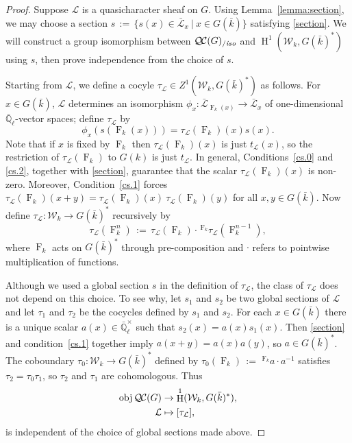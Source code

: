 \documentclass[11pt]{amsart}
\theoremstyle{plain}
\theoremstyle{definition}
\theoremstyle{remark}
\newcommand{\EE}{\mathbb{\bar Q}_\ell}
\newcommand{\bFq}{\bar{k}}
\newcommand{\Fq}{k}
\newcommand{\EEx}{\EE^\times}
\newcommand{\Frob}[1]{\operatorname{F}_{#1}}
\DeclareMathOperator{\Hh}{H}
\newcommand{\ceq}{{\, :=\, }}
\newcommand{\tq}{{\ \vert\ }}
\newcommand{\obj}{{\text{obj}\, }}
\newcommand{\qcs}[1]{{\mathcal{#1}}}
\newcommand{\gqcs}[1]{{\mathcal{\bar #1}}}
\newcommand{\QC}{{\mathcal{Q\hskip-0.8pt C}}}
\newcommand{\QCiso}[1]{\QC(#1)_{/\textit{iso}}}
\newcommand{\Weil}[1]{\mathcal{W}_{#1}}
\newcommand{\trFrob}[1]{t_{#1}}
\begin{document}
\begin{proof}
  Suppose $\qcs{L}$ is a quasicharacter sheaf on $G$.  
  Using Lemma~\ref{lemma:section}, 
  we may choose a section $s \ceq \{ s(x) \in \gqcs{L}_x \tq x \in G(\bFq) \}$ satisfying \eqref{section}.
  We will construct a group isomorphism between $\QCiso{G}$ and
  $\Hh^1(\Weil{\Fq}, G(\bFq)^*)$ using $s$, then prove independence from the choice of $s$.

  Starting from $\qcs{L}$, we define a cocyle $\tau_{\qcs{L}} \in Z^1(\Weil{\Fq},G(\bFq)^*)$ as follows.
  For $x \in G(\bFq)$, $\qcs{L}$ determines an isomorphism $\phi_x : \gqcs{L}_{\Frob{\Fq}(x)} \to \gqcs{L}_x$
  of one-dimensional $\EE$-vector spaces; define $\tau_\qcs{L}$ by
  \begin{equation}\label{t}
   \phi_{x}(s(\Frob{\Fq}(x))) = \tau_\qcs{L}(\Frob{\Fq})(x) s(x).
  \end{equation}
  Note that if $x$ is fixed by $\Frob{k}$ then $\tau_\qcs{L}(\Frob{\Fq})(x)$ is just $\trFrob{\qcs{L}}(x)$, so the restriction of
  $\tau_\qcs{L}(\Frob{k})$ to $G(k)$ is just $\trFrob{\qcs{L}}$.
  In general, Conditions~\ref{cs.0} and \ref{cs.2}, together with \eqref{section}, guarantee that
  the scalar $\tau_\qcs{L}(\Frob{k})(x)$ is non-zero.  Moreover, Condition~\ref{cs.1} forces
  $\tau_\qcs{L}(\Frob{\Fq})(x+y) = \tau_\qcs{L}(\Frob{\Fq})(x) \ \tau_\qcs{L}(\Frob{\Fq})(y)$
  for all $x,y \in G(\bFq)$.  Now define $\tau_\qcs{L} : \Weil{\Fq} \to G(\bFq)^*$ recursively by
  \[
   \tau_\qcs{L}(\Frob{\Fq}^n) \ceq \tau_\qcs{L}(\Frob{\Fq})\cdot \,^{\Frob{\Fq}} \tau_\qcs{L}(\Frob{\Fq}^{n-1}),
  \]
  where $\Frob{\Fq}$ acts on $G(\bFq)^*$ through pre-composition and $\cdot$ refers
  to pointwise multiplication of functions.

  Although we used a global section $s$ in the definition of
  $\tau_\qcs{L}$, the class of $\tau_\qcs{L}$ does not depend on this
  choice. To see why, let $s_1$ and $s_2$ be two global sections of
  $\qcs{L}$ and let $\tau_1$ and $\tau_2$ be the cocycles defined by $s_1$ and $s_2$.
  For each $x \in G(\bFq)$ there is a unique scalar
  $a(x) \in \EEx$ such that $s_2(x) = a(x) s_1(x)$. Then \eqref{section} and
  condition~\ref{cs.1} together imply $a(x+y) = a(x)a(y)$, so
  $a\in G(\bFq)^*$.  The coboundary $\tau_0 : \Weil{\Fq} \to G(\bFq)^*$
  defined by $\tau_0(\Frob{\Fq}) \ceq \,^{\Frob{\Fq}} a \cdot a^{-1}$ satisfies $\tau_2 = \tau_0 \tau_1$,
  so $\tau_2$ and $\tau_1$ are cohomologous. Thus
  \begin{equation}\label{cohomologous}
  \begin{split}
    \obj \QC(G) &\to \Hh^1(\Weil{\Fq},G(\bFq)^*), \\
    \qcs{L} &\mapsto [\tau_\qcs{L}],
  \end{split}
  \end{equation}
  is independent of the choice of global sections made above.


\end{proof}
\end{document}
